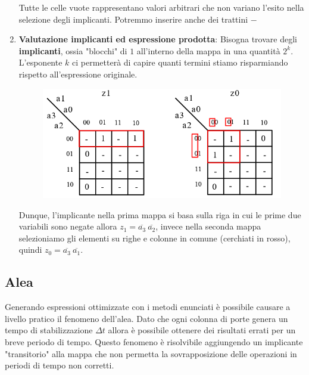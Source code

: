 \documentclass{article}
\begin{document}
\begin{enumerate}
    Tutte le celle vuote rappresentano valori arbitrari che non variano l'esito nella selezione degli implicanti. Potremmo inserire anche dei trattini $-$

    \item \textbf{Valutazione implicanti ed espressione prodotta}: Bisogna trovare degli \textbf{implicanti}, ossia "blocchi" di $1$ all'interno della mappa in una quantità $2^{k}$. L'esponente $k$ ci permetterà di capire quanti termini stiamo risparmiando rispetto all'espressione originale.

    \begin{figure}[htbp]
        \center
        \includegraphics[scale=0.42]{img/tabellaEsempioKarnaugh2.png}
    \end{figure}

    Dunque, l'implicante nella prima mappa si basa sulla riga in cui le prime due variabili sono negate allora $z_{1} = \overline{a_{3}} \: \overline{a_{2}}$, invece nella seconda mappa selezioniamo gli elementi su righe e colonne in comune (cerchiati in rosso), quindi 
    $z_{0} = \overline{a_{3}} \: \overline{a_{1}}$.
    
\end{enumerate}

\newpage

\subsection{Alea}

Generando espressioni ottimizzate con i metodi enunciati
è possibile causare a livello pratico il fenomeno dell'alea.
Dato che ogni colonna di porte genera un tempo di stabilizzazione $\Delta t$ allora è possibile ottenere dei risultati errati per un breve periodo di tempo.
Questo fenomeno è risolvibile aggiungendo un implicante "transitorio" alla mappa che non permetta la sovrapposizione delle operazioni in periodi di tempo non corretti.
\end{document}
